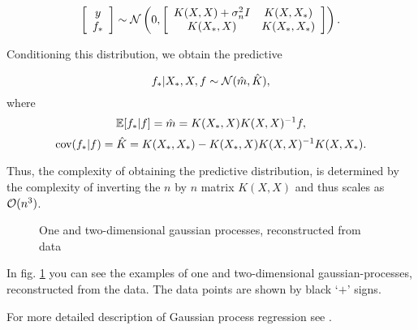$$
\left [ \begin{array}{c} y\\ f_* \end{array} \right ]
\sim
\mathcal{N} \left ( 0, \left [\begin{array}{cc} K(X, X) + \sigma_n^2 I & K(X, X_*)\\ K(X_*, X) & K(X_*, X_*) \end{array} \right] \right ).
$$

Conditioning this distribution, we obtain the predictive


$$f_* | X_*, X, f \sim \mathcal{N}( \hat m, \hat K ),$$
where 
$$\mathbb{E} [f_* | f ] = \hat m = K(X_*, X) K(X, X)^{-1} f,$$
$$\mbox{cov}(f_* | f ) = \hat K = K(X_*, X_*) - K(X_*, X)K(X, X)^{-1}K(X, X_*).$$

Thus, the complexity of obtaining the predictive distribution, is determined by the complexity of inverting the $n$ by $n$ matrix $K(X, X)$ and thus scales as $\mathcal{O}(n^3)$.

\begin{figure}[!h]
	\centering
	\subfloat{
		\scalebox{0.7}{
			
		}
	}
	\subfloat{
		\scalebox{0.7}{
    		
		}
	}
	\caption{One and two-dimensional gaussian processes, reconstructed from data}
	\label{brute_reg_example}
\end{figure}


In fig. \ref{brute_reg_example} you can see the examples of one and two-dimensional gaussian-processes, reconstructed from the data. The data points are shown by black `$+$' signs. 

For more detailed description of Gaussian process regression see \cite{GPinML}.